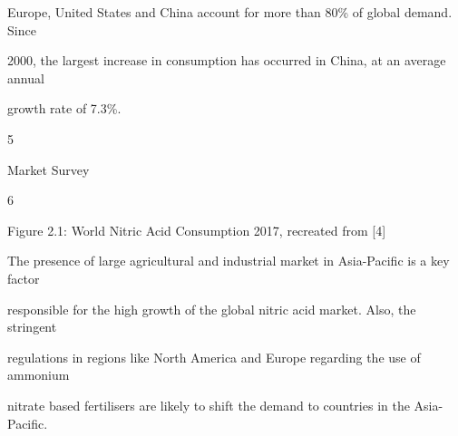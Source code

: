 \documentclass[a4paper,portrait,12pt]{article}
\begin{document}
\begin{flushleft}
Europe, United States and China account for more than 80\% of global demand. Since
\end{flushleft}


\begin{flushleft}
2000, the largest increase in consumption has occurred in China, at an average annual
\end{flushleft}


\begin{flushleft}
growth rate of 7.3\%.
\end{flushleft}





5





\begin{flushleft}
\newpage
Market Survey
\end{flushleft}





6





\begin{flushleft}
Figure 2.1: World Nitric Acid Consumption 2017, recreated from [4]
\end{flushleft}





\begin{flushleft}
The presence of large agricultural and industrial market in Asia-Pacific is a key factor
\end{flushleft}


\begin{flushleft}
responsible for the high growth of the global nitric acid market. Also, the stringent
\end{flushleft}


\begin{flushleft}
regulations in regions like North America and Europe regarding the use of ammonium
\end{flushleft}


\begin{flushleft}
nitrate based fertilisers are likely to shift the demand to countries in the Asia-Pacific.
\end{flushleft}
\end{document}
